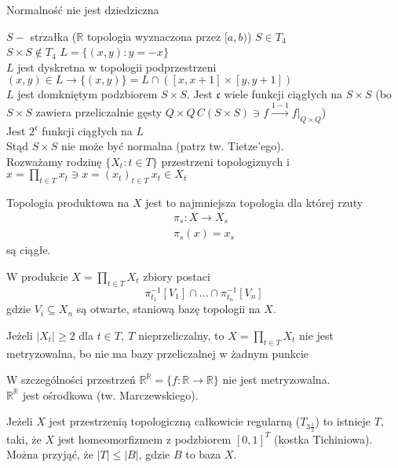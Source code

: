\begin{ft} 
    Normalność nie jest dziedziczna
\end{ft} 
\begin{prz} 
    $S - $ strzałka ($\mathbb R$ topologia wyznaczona przez $[a,b)$)
    $S \in T_4$ \\ 
    $S \times S \notin T_4$
    $L = \{ (x,y): y = -x \}$ \\ 
    $L$ jest dyskretna w topologii podprzestrzeni $(x,y) \in L \to \{(x,y)\} = 
    L \cap ([x,x+1] \times [y,y+1])$ \\ 
    $L$ jest domkniętym podzbiorem $S \times S$. 
    Jest $\mathfrak{c}$ wiele funkcji ciągłych na $S \times S$ (bo $S \times S$ zawiera
    przeliczalnie gęsty $Q\times Q\, C(S \times S) \ni f\xrightarrow{1-1} f|_{Q\times Q}$)
    \\Jest $2^{\mathfrak{c}}$ funkcji ciągłych na $L$ \\ 
    Stąd $S \times S$ nie może być normalna (patrz tw. Tietze'ego).\\[1cm] 
    Rozważamy rodzinę $\{X_t : t \in T\}$ przestrzeni topologiznych i $x = \prod\limits
    _{t \in T} x_t \ni x = (x_t)_{t \in T} \ x_t \in X_t$ 
\end{prz} 
\begin{df} 
    Topologia produktowa na $X$ jest to najmniejsza topologia dla której rzuty 
    \begin{gather} 
        \pi_s : X \to X_s \\ 
        \pi_s (x) = x_s 
    \end{gather} są ciągłe.
\end{df} 
\begin{tw} 
    W produkcie $X = \prod\limits_{t \in T} X_t$ zbiory postaci 
    \[ \pi_{t_1}^{-1}[V_1] \cap \ldots \cap \pi_{t_n}^{-1} [V_n] \] 
    gdzie $V_i \subseteq X_n$ są otwarte, staniową bazę topologii na $X$.
\end{tw} 
\begin{uw} 
    Jeżeli $|X_t| \ge 2$ dla $t \in T,\ T$ nieprzeliczalny, to $X = \prod\limits_{t \in T}
    X_t$ nie jest metryzowalna, bo nie ma bazy przeliczalnej w żadnym punkcie
\end{uw} 
W szczególności przestrzeń $\mathbb R ^ \mathbb R = \{ f : \mathbb R \to \mathbb R\}$ nie
jest metryzowalna. \\ 
$\mathbb R ^ \mathbb R$ jest ośrodkowa (tw. Marczewskiego).
\begin{tw} 
    Jeżeli $X$ jest przestrzenią topologiczną całkowicie regularną ($T_{3 \frac{1}{2}}$)
    to istnieje $T$, taki, że $X$ jest homeomorfizmem z podzbiorem $[0,1]^T$ (kostka
    Tichiniowa). Można przyjąć, że $|T| \le |B|$, gdzie $B$ to baza $X$.
\end{tw} 
